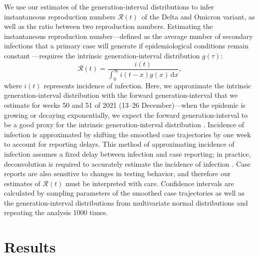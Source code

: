 \documentclass[12pt]{article}
\newcommand{\comment}{\showcomment}
\newcommand{\showcomment}[3]{\textcolor{#1}{\textbf{[#2: }\textsl{#3}\textbf{]}}}
\newcommand{\jd}[1]{\comment{cyan}{JD}{#1}}
\newcommand{\swp}[1]{\comment{magenta}{SWP}{#1}}
\newcommand{\Rt}{\ensuremath{{\mathcal R}(t)}\xspace}
\newcommand{\dd}[1]{\ensuremath{\, \mathrm{d}#1}}
\newcommand{\dx}{\dd{x}}
\begin{document}
We use our estimates of the generation-interval distributions to infer instantaneous reproduction numbers \Rt\ of the Delta and Omicron variant, as well as the ratio between two reproduction numbers.
Estimating the instantaneous reproduction number---defined as the average number of secondary infections that a primary case will generate if epidemiological conditions remain constant \citep{fraser2007estimating}---requires the intrinsic generation-interval distribution $g(\tau)$:
\begin{equation}
\Rt = \frac{i(t)}{\int_0^\infty i(t-x) g(x) \dx},
\end{equation}
where $i(t)$ represents incidence of infection.
Here, we approximate the intrinsic generation-interval distribution with the forward generation-interval that we estimate for weeks 50 and 51 of 2021 (13--26 December)---when the epidemic is growing or decaying exponentially, we expect the forward generation-interval to be a good proxy for the intrinsic generation-interval distribution \citep{champredon2015intrinsic, park2020inferring}.
Incidence of infection is approximated by shifting the smoothed case trajectories by one week to account for reporting delays.
This method of approximating incidence of infection assumes a fixed delay between infection and case reporting;
in practice, deconvolution is required to accurately estimate the incidence of infection \citep{goldstein2009reconstructing}.
Case reports are also sensitive to changes in testing behavior, and therefore our estimates of $\Rt$ must be interpreted with care.
Confidence intervals are calculated by sampling parameters of the smoothed case trajectories as well as the generation-interval distributions from multivariate normal distributions and repeating the analysis 1000 times.

\section{Results}
\end{document}
